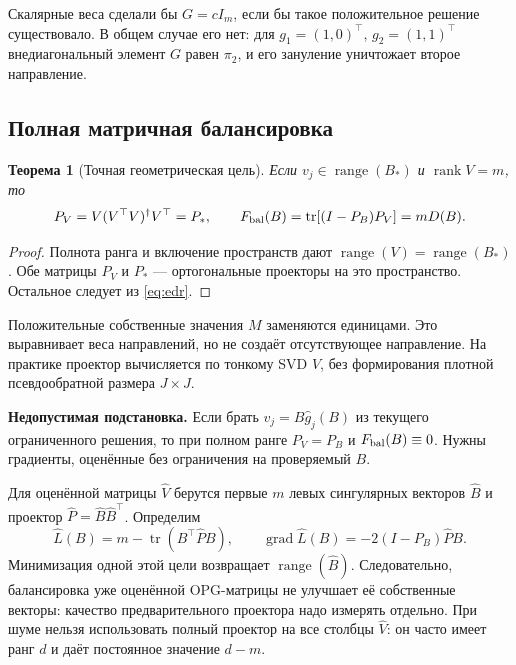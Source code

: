 \documentclass[11pt,a4paper]{article}
\newcommand{\tr}{\operatorname{tr}}
\newcommand{\rank}{\operatorname{rank}}
\newtheorem{theorem}{Теорема}
\begin{document}
Скалярные веса сделали бы $G=cI_m$, если бы такое положительное
решение существовало. В общем случае его нет: для $g_1=(1,0)^\top$,
$g_2=(1,1)^\top$ внедиагональный элемент $G$ равен $\pi_2$,
и его зануление уничтожает второе направление.

\subsection{Полная матричная балансировка}
\begin{theorem}[Точная геометрическая цель]\label{thm:balance}
Если $v_j\in\operatorname{range}(B_*)$ и $\rank V=m$, то
\begin{equation}\label{eq:balance}
 P_V=V(V^\top V)^\dagger V^\top=P_*,\qquad
 F_{\rm bal}(B)=\tr[(I-P_B)P_V]=mD(B).
\end{equation}
\end{theorem}
\begin{proof}
Полнота ранга и включение пространств дают
$\operatorname{range}(V)=\operatorname{range}(B_*)$. Обе матрицы
$P_V$ и $P_*$ --- ортогональные проекторы на это пространство.
Остальное следует из \eqref{eq:edr}.
\end{proof}
Положительные собственные значения $M$ заменяются единицами.
Это выравнивает веса направлений, но не создаёт отсутствующее направление.
На практике проектор вычисляется по тонкому SVD $V$, без формирования
плотной псевдообратной размера $J\times J$.

\textbf{Недопустимая подстановка.} Если брать $v_j=B\widehat g_j(B)$
из текущего ограниченного решения, то при полном ранге $P_V=P_B$ и
$F_{\rm bal}(B)\equiv0$. Нужны градиенты, оценённые без ограничения
на проверяемый $B$.

Для оценённой матрицы $\widehat V$ берутся первые $m$ левых сингулярных
векторов $\widehat B$ и проектор $\widehat P=\widehat B\widehat B^\top$.
Определим
\begin{equation}\label{eq:surrogate}
 \widehat L(B)=m-\tr(B^\top\widehat PB),\qquad
 \operatorname{grad}\widehat L(B)=-2(I-P_B)\widehat PB.
\end{equation}
Минимизация одной этой цели возвращает $\operatorname{range}(\widehat B)$.
Следовательно, балансировка уже оценённой OPG-матрицы не улучшает её
собственные векторы: качество предварительного проектора надо измерять
отдельно. При шуме нельзя использовать полный проектор на все столбцы
$\widehat V$: он часто имеет ранг $d$ и даёт постоянное значение $d-m$.
\end{document}
